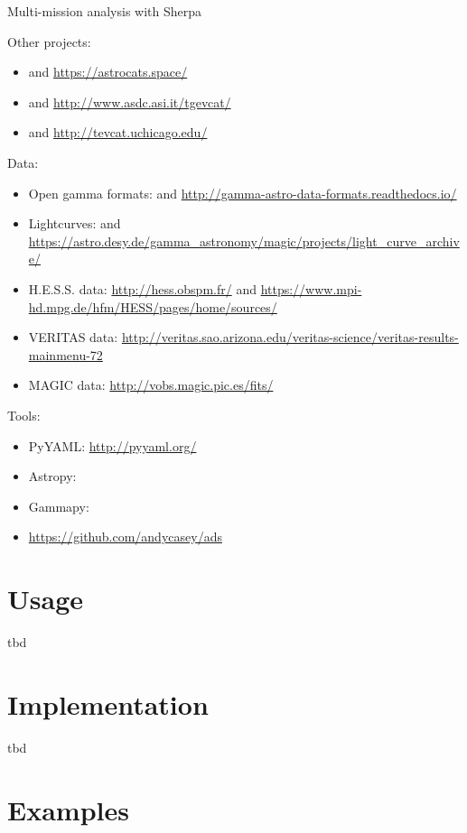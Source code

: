 \documentclass[11pt,twoside]{article}
\begin{document}
Multi-mission analysis with Sherpa \citep{sherpa}

Other projects:

\begin{itemize}
\item \citet{sne-cat} and \url{https://astrocats.space/}
\item \citet{tgevcat} and \url{http://www.asdc.asi.it/tgevcat/}
\item \citet{tevcat} and \url{http://tevcat.uchicago.edu/}
\end{itemize}

Data:

\begin{itemize}
\item Open gamma formats: \citet{open-gamma} and \url{http://gamma-astro-data-formats.readthedocs.io/}
\item Lightcurves: \citet{lc} and \url{https://astro.desy.de/gamma_astronomy/magic/projects/light_curve_archive/}
\item H.E.S.S. data: \url{http://hess.obspm.fr/} and \url{https://www.mpi-hd.mpg.de/hfm/HESS/pages/home/sources/}
\item VERITAS data: \url{http://veritas.sao.arizona.edu/veritas-science/veritas-results-mainmenu-72}
\item MAGIC data: \url{http://vobs.magic.pic.es/fits/}
\end{itemize}

Tools:

\begin{itemize}
\item PyYAML: \url{http://pyyaml.org/}
\item Astropy: \citet{astropy}
\item Gammapy: \citet{gammapy}
\item \url{https://github.com/andycasey/ads}
\end{itemize}

\section{Usage}

tbd

\section{Implementation}

tbd

\section{Examples}
\end{document}
